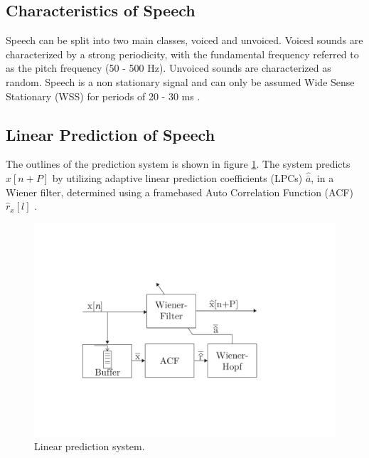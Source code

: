 \subsection{Characteristics of Speech}
Speech can be split into two main classes, voiced and unvoiced. Voiced sounds are characterized by a strong periodicity, with the fundamental frequency referred to as the pitch frequency (50 - 500 Hz). Unvoiced sounds are characterized as random. Speech is a non stationary signal and can only be assumed Wide Sense Stationary (WSS) for periods of 20 - 30 ms \cite{Speech}. 

\subsection{Linear Prediction of Speech}
The outlines of the prediction system is shown in figure \ref{fig:LinearPredictionOverview}. The system predicts $\hat{x}[n+P]$ by utilizing adaptive linear prediction coefficients (LPCs) $\hat{\bar{a}}$, in a Wiener filter, determined using a framebased Auto Correlation Function (ACF) $\hat{r}_x[l]$ \cite{LinearPrediction}.   

\begin{figure}[H]
	\centering
	\includegraphics[width=\columnwidth]{figures/ArticleIllustrations/WienerHopf}
	\caption{Linear prediction system.}
	\label{fig:LinearPredictionOverview}
\end{figure}


